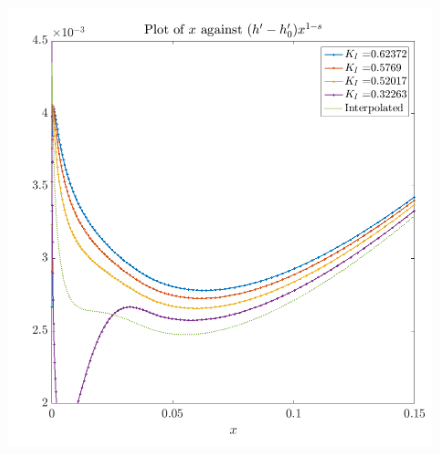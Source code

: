 \documentclass{article}
\begin{document}
\begin{figure}[ht]\centering
\includegraphics[scale=0.45]{h1_prime.png}
\end{figure}
\end{document}
